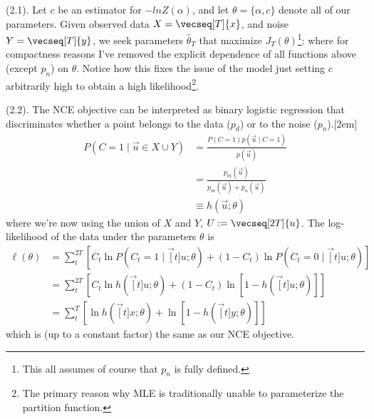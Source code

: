 \documentclass[11pt]{article}
\begin{document}
\myspace
\p {} (2.1). Let $c$ be an estimator for $-ln Z(\alpha)$, and let $\theta = \{\alpha, c\}$ denote all of our parameters. Given observed data $X = \vecseq[T]{x}$, and noise $Y = \vecseq[T]{y}$, we seek parameters $\hat{\theta}_T$ that maximize $J_T(\theta)$\footnote{This all assumes of course that $p_n$ is fully defined.}:
where for compactness reasons I've removed the explicit dependence of all functions above (except $p_n$) on $\theta$. Notice how this fixes the issue of the model just setting $c$ arbitrarily high to obtain a high likelihood\footnote{The primary reason why MLE is traditionally unable to parameterize the partition function.}.

\myspace
\p {} (2.2). The NCE objective can be interpreted as binary logistic regression that discriminates whether a point belongs to the data ($p_d$) or to the noise ($p_n$).[2em]
\begin{align}
P(C{=}1 \mid \vec u \in X \cup Y)
&= \frac{ P(C{=1}) p(\vec u \mid C{=}1) }{  p(\vec u) } \\
&= \frac{  p_m(\vec u) }{   p_m(\vec u) + p_n(\vec u)  } \\
&\equiv h(\vec u; \theta)
\end{align}
where we're now using the union of $X$ and $Y$, $U := \vecseq[2T]{u}$. The log-likelihood of the data under the parameters $\theta$ is
\begin{align}
\ell(\theta)
&= \sum_t^{2T} \left[
C_t \ln P(C_t{=}1 \mid \vec[t]{u};\theta) 
+ (1 - C_t) \ln P(C_t{=}0 \mid \vec[t]{u} ; \theta) \right] \\
&= \sum_t^{2T} \left[
C_t \ln h(\vec[t]{u}; \theta)
+ (1 - C_t) \ln \left[ 1 - h(\vec[t]{u}; \theta)  \right] \right] \\
&= \sum_t^T \left[
\ln h(\vec[t]{x}; \theta)
+ \ln \left[ 1 - h(\vec[t]{y}; \theta)  \right]
\right]
\end{align}
which is (up to a constant factor) the same as our NCE objective.
\end{document}
